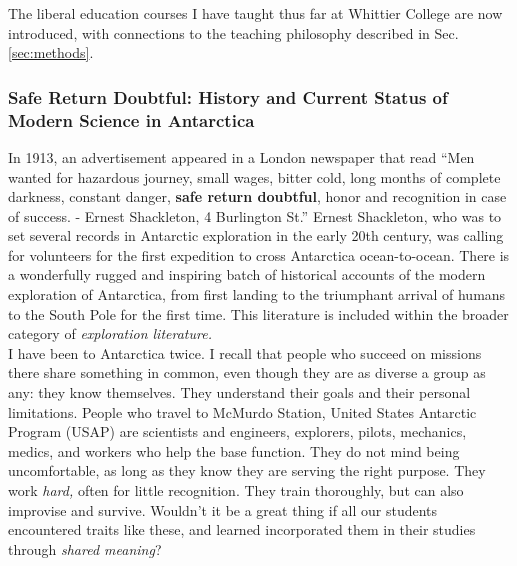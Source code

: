 \documentclass[../../../main.tex]{subfiles}
\begin{document}
The liberal education courses I have taught thus far at Whittier College are now introduced, with connections to the teaching philosophy described in Sec. \ref{sec:methods}.

\subsubsection{Safe Return Doubtful: History and Current Status of Modern Science in Antarctica}

In 1913, an advertisement appeared in a London newspaper that read ``Men wanted for hazardous journey, small wages, bitter cold, long months of complete darkness, constant danger, \textbf{safe return doubtful}, honor and recognition in case of success. - Ernest Shackleton, 4 Burlington St.''  Ernest Shackleton, who was to set several records in Antarctic exploration in the early 20th century, was calling for volunteers for the first expedition to cross Antarctica ocean-to-ocean.  There is a wonderfully rugged and inspiring batch of historical accounts of the modern exploration of Antarctica, from first landing to the triumphant arrival of humans to the South Pole for the first time.  This literature is included within the broader category of \textit{exploration literature.}
\\
\vspace{0.25cm}
I have been to Antarctica twice.  I recall that people who succeed on missions there share something in common, even though they are as diverse a group as any: they know themselves.  They understand their goals and their personal limitations.  People who travel to McMurdo Station, United States Antarctic Program (USAP) are scientists and engineers, explorers, pilots, mechanics, medics, and workers who help the base function.  They do not mind being uncomfortable, as long as they know they are serving the right purpose.  They work \textit{hard,} often for little recognition.  They train thoroughly, but can also improvise and survive.  Wouldn't it be a great thing if all our students encountered traits like these, and learned incorporated them in their studies through \textit{shared meaning}?
\\
\vspace{0.25cm}
\end{document}

